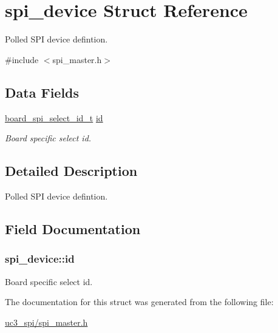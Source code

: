 \hypertarget{structspi__device}{
\section{spi\-\_\-device \-Struct \-Reference}
\label{structspi__device}
}


\-Polled \-S\-P\-I device defintion.  




{\ttfamily \#include $<$spi\-\_\-master.\-h$>$}

\subsection*{\-Data \-Fields}
\begin{DoxyCompactItemize}
\item 
\hyperlink{uc3__spi_2spi__master_8h_a0216987e3f93d6bd7392bb7f28c3db2c}{board\-\_\-spi\-\_\-select\-\_\-id\-\_\-t} \hyperlink{structspi__device_a3bf4dff6c088541b056ff3a082fe2f68}{id}
\begin{DoxyCompactList}\small\item\em \-Board specific select id. \end{DoxyCompactList}\end{DoxyCompactItemize}


\subsection{\-Detailed \-Description}
\-Polled \-S\-P\-I device defintion. 

\subsection{\-Field \-Documentation}
\hypertarget{structspi__device_a3bf4dff6c088541b056ff3a082fe2f68}{
\subsubsection[{id}]{ {\bf spi\-\_\-device\-::id}}}
\label{structspi__device_a3bf4dff6c088541b056ff3a082fe2f68}


\-Board specific select id. 



\-The documentation for this struct was generated from the following file\-:\begin{DoxyCompactItemize}
\item 
\hyperlink{uc3__spi_2spi__master_8h}{uc3\-\_\-spi/spi\-\_\-master.\-h}\end{DoxyCompactItemize}
